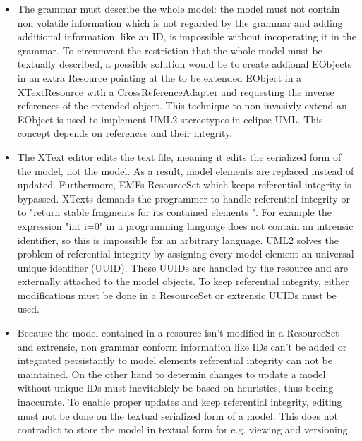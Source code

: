 \begin{itemize}
	\item The grammar must describe the whole model: the model must not contain non volatile information which is not regarded by the grammar and adding additional information, like an ID, is impossible without incoperating it in the grammar. To circumvent the restriction that the whole model must be textually described, a possible solution would be to create addional EObjects in an extra Resource pointing at the to be extended EObject in a XTextResource with a CrossReferenceAdapter and requesting the inverse references of  the extended object. This technique to non invasivly extend an EObject is used to implement UML2 stereotypes in eclipse UML. This concept depends on references and their integrity.
	\item The XText editor edits the text file, meaning it edits the serialized form of the model, not the model. As a result, model elements are replaced instead of updated. Furthermore, EMFs ResourceSet which keeps referential integrity is bypassed. XTexts demands the programmer to handle referential integrity or to "return stable fragments for its contained elements ". For example the expression "int i=0" in a programming language does not contain an intrensic identifier, so this is impossible for an arbitrary language. UML2 solves the problem of referential integrity by assigning every model element an universal unique identifier (UUID). These UUIDs are handled by the resource and are  externally attached to the model objects. To keep referential integrity, either modifications must be done in a ResourceSet or extrensic UUIDs must be used. 
	\item Because the model contained in a resource isn't modified in a ResourceSet and extrensic, non grammar conform information like IDs can't be added or integrated persistantly to model elements referential integrity can not be maintained. On the other hand to determin changes to update a model without unique IDs must inevitablely be based on heuristics, thus beeing inaccurate.  To enable proper updates and keep referential integrity, editing must not be done on the textual serialized form of a model. This does not contradict to store the model in textual form for e.g. viewing and versioning.
\end{itemize}

